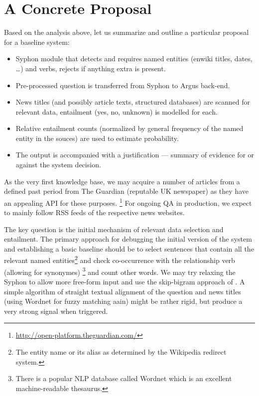 \documentclass[11pt,a4paper]{article}
\begin{document}
\section{A Concrete Proposal}
\label{system}

Based on the analysis above, let us summarize and outline a particular
proposal for a baseline system:

\begin{itemize}
	\item Syphon module that detects and requires named entities (enwiki titles, dates, \dots) and verbs, rejects if anything extra is present.
	\item Pre-processed question is transferred from Syphon to Argus back-end.
	\item News titles (and possibly article texts, structured databases) are scanned for relevant data, entailment (yes, no, unknown) is modelled for each.
	\item Relative entailment counts (normalized by general frequency of the named entity in the souces) are used to estimate probability.
	\item The output is accompanied with a justification --- summary of evidence for or against the system decision.
\end{itemize}

As the very first knowledge base, we may acquire a number of articles
from a defined past period from The Guardian (reputable UK newspaper)
as they have an appealing API for these purposes.%
\footnote{\url{http://open-platform.theguardian.com/}}
For ongoing QA in production, we expect to mainly follow RSS feeds
of the respective news websites.

The key question is the initial mechanism of relevant data selection
and entailment.  The primary approach for debugging the initial version
of the system and establishing a basic baseline should be to select
sentences that contain all the relevant named entities\footnote{The entity name or its alias as determined
by the Wikipedia redirect system.} and check co-occurrence with the
relationship verb (allowing for synonymes)%
\footnote{There is a popular NLP database called Wordnet which is
an excellent machine-readable thesaurus.} and count other words.
We may try relaxing the Syphon to allow more free-form input and
use the skip-bigram approach of \citep{WatsonEvidence}.
A simple algorithm of straight textual alignment of the question and news titles \citep{WatsonEvidence}
(using Wordnet for fuzzy matching aain) might be rather rigid,
but produce a very strong signal when triggered.
\end{document}
